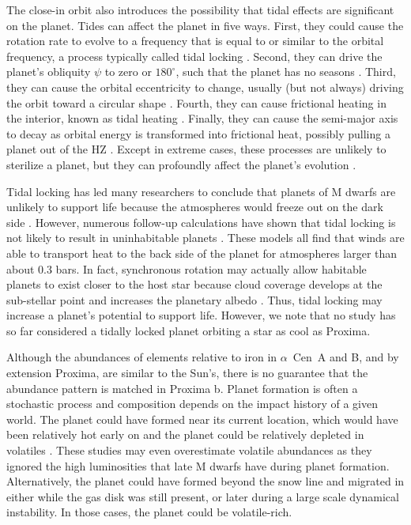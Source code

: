 \documentclass[preprint,12pt]{aastex}
\def\acen{{$\alpha$~Cen}}
\begin{document}
The close-in orbit also introduces the possibility that tidal effects
are significant on the planet. Tides can affect the planet in five
ways. First, they could cause the rotation rate to evolve to a
frequency that is equal to or similar to the orbital frequency, a
process typically called tidal locking
\citep{Dole64,Kasting93,Barnes16}. Second, they can drive the planet's
obliquity $\psi$ to zero or $180^{\circ}$, such that the planet has no seasons
\citep{Heller11}. Third, they can cause the orbital eccentricity to
change, usually (but not always) driving the orbit toward a circular
shape \citep{Darwin1880,FerrazMello08}. Fourth, they can cause
frictional heating in the interior, known as tidal heating
\citep{Peale79,Jackson08c,Barnes13}. Finally, they can cause the
semi-major axis to decay as orbital energy is transformed into
frictional heat, possibly pulling a planet out of the HZ
\citep{Darwin1880,Barnes08}. Except in extreme cases, these processes
are unlikely to sterilize a planet, but they can profoundly affect the
planet's evolution \citep{DriscollBarnes15}.

Tidal locking has led many researchers to conclude that planets of M
dwarfs are unlikely to support life because the atmospheres would
freeze out on the dark side \citep{Kasting93}. However, numerous
follow-up calculations have shown that tidal locking is not likely to
result in uninhabitable planets
\citep{Joshi97,Pierrehumbert11,Wordsworth11,Yang13,Shields16,Kopparapu16}. These
models all find that winds are able to transport heat to the back side
of the planet for atmospheres larger than about 0.3 bars. In fact,
synchronous rotation may actually allow habitable planets to exist
closer to the host star because cloud coverage develops at the
sub-stellar point and increases the planetary albedo
\citep{Yang13}. Thus, tidal locking may increase a planet's potential
to support life. However, we note that no study has so far considered a tidally locked planet orbiting a star as cool as Proxima.

Although the abundances of elements relative to iron in \acen~A and B,
and by extension Proxima, are similar to the Sun's, there is no
guarantee that the abundance pattern is matched in Proxima
b. Planet formation is often a stochastic process and composition
depends on the impact history of a given world. The planet could have
formed near its current location, which would have been relatively hot
early on and the planet could be relatively depleted in volatiles
\citep{Raymond07,Mulders15}. These studies may even overestimate
volatile abundances as they ignored the high luminosities that late M
dwarfs have during planet formation. Alternatively, the planet could
have formed beyond the snow line and migrated in either while the gas
disk was still present, or later during a large scale dynamical
instability. In those cases, the planet could be
volatile-rich.
\end{document}
